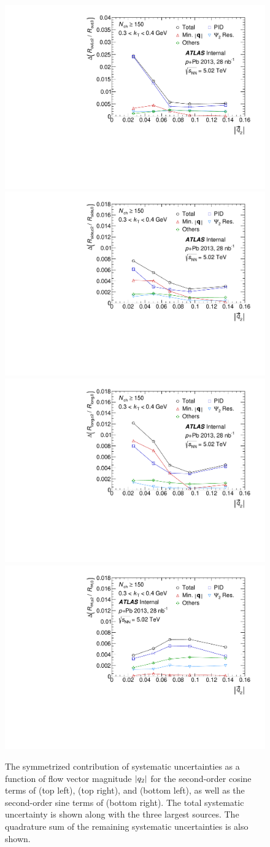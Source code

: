 \begin{figure}[t]
\centering
\includegraphics[width=.49\linewidth]{can_syst_breakdown_gr_u_Rout_vs_q2_kt2.pdf}
\includegraphics[width=.49\linewidth]{can_syst_breakdown_gr_u_Rside_vs_q2_kt2.pdf}\\
\includegraphics[width=.49\linewidth]{can_syst_breakdown_gr_u_Rlong_vs_q2_kt2.pdf}
\includegraphics[width=.49\linewidth]{can_syst_breakdown_gr_w_Ros_vs_q2_kt2.pdf}\\
\caption{The symmetrized contribution of systematic uncertainties as a function of flow vector magnitude $|q_{2}|$ for the second-order cosine terms of \Rout (top left), \Rside (top right), and \Rlong (bottom left), as well as the second-order sine terms of \Ros (bottom right). The total systematic uncertainty is shown along with the three largest sources. The quadrature sum of the remaining systematic uncertainties is also shown.}
\label{fig:azi_syst_breakdown}
\end{figure}

